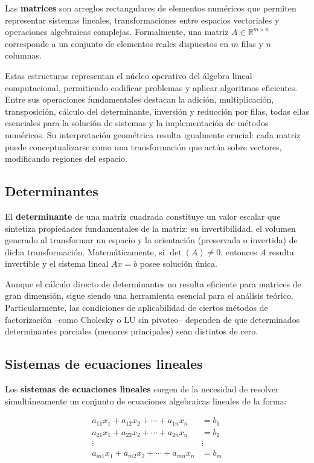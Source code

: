 Las \textbf{matrices} son arreglos rectangulares de elementos numéricos que permiten representar sistemas lineales, transformaciones entre espacios vectoriales y operaciones algebraicas complejas. Formalmente, una matriz $A \in \mathbb{R}^{m \times n}$ corresponde a un conjunto de elementos reales dispuestos en $m$ filas y $n$ columnas.

Estas estructuras representan el núcleo operativo del álgebra lineal computacional, permitiendo codificar problemas y aplicar algoritmos eficientes. Entre sus operaciones fundamentales destacan la adición, multiplicación, transposición, cálculo del determinante, inversión y reducción por filas, todas ellas esenciales para la solución de sistemas y la implementación de métodos numéricos. Su interpretación geométrica resulta igualmente crucial: cada matriz puede conceptualizarse como una transformación que actúa sobre vectores, modificando regiones del espacio.

\subsection{Determinantes}

El \textbf{determinante} de una matriz cuadrada constituye un valor escalar que sintetiza propiedades fundamentales de la matriz: su invertibilidad, el volumen generado al transformar un espacio y la orientación (preservada o invertida) de dicha transformación. Matemáticamente, si $\det(A) \neq 0$, entonces $A$ resulta invertible y el sistema lineal $Ax = b$ posee solución única.

Aunque el cálculo directo de determinantes no resulta eficiente para matrices de gran dimensión, sigue siendo una herramienta esencial para el análisis teórico. Particularmente, las condiciones de aplicabilidad de ciertos métodos de factorización --como Cholesky o LU sin pivoteo-- dependen de que determinados determinantes parciales (menores principales) sean distintos de cero.

\subsection{Sistemas de ecuaciones lineales}

Los \textbf{sistemas de ecuaciones lineales} surgen de la necesidad de resolver simultáneamente un conjunto de ecuaciones algebraicas lineales de la forma:

\[
\begin{aligned}
	a_{11}x_1 + a_{12}x_2 + \cdots + a_{1n}x_n &= b_1 \\
	a_{21}x_1 + a_{22}x_2 + \cdots + a_{2n}x_n &= b_2 \\
	\vdots \quad \quad \quad & \vdots \\
	a_{m1}x_1 + a_{m2}x_2 + \cdots + a_{mn}x_n &= b_m \\
\end{aligned}
\]

